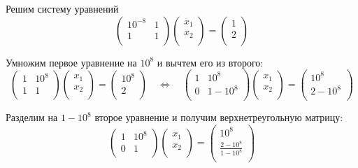 \documentclass{article}
\begin{document}
\begin{example}
	Решим систему уравнений
	\[
		\begin{pmatrix}
			10^{-8}	& 1	\\
			1	& 1	\\
		\end{pmatrix}
		\begin{pmatrix}
			x_1 \\
			x_2 \\
		\end{pmatrix}
		=
		\begin{pmatrix}
			1 \\
			2 \\
		\end{pmatrix}
	\]

	Умножим первое уравнение на $10^8$ и вычтем его из второго:
	\[
		\begin{pmatrix}
			1	& 10^8	\\
			1	& 1	\\
		\end{pmatrix}
		\begin{pmatrix}	
			x_1 \\
			x_2 \\
		\end{pmatrix}
		=
		\begin{pmatrix}
			10^8 \\
			2    \\
		\end{pmatrix}
		\quad\Leftrightarrow\quad
		\begin{pmatrix}
			1	& 10^8	\\
			0	&1-10^8	\\
		\end{pmatrix}
		\begin{pmatrix}
			x_1 \\
			x_2 \\
		\end{pmatrix}
		=
		\begin{pmatrix}
			10^8 \\
			2-10^8 \\
		\end{pmatrix}
	\]

	Разделим на $1-10^8$ второе уравнение и получим верхнетреугольную
	матрицу:
	\[
		\begin{pmatrix}
			1	& 10^8	\\
			0	& 1	\\
		\end{pmatrix}
		\begin{pmatrix}
			x_1 \\
			x_2 \\
		\end{pmatrix}
		=
		\begin{pmatrix}
			10^8 \\
			\frac{2-10^8}{1-10^8} \\
		\end{pmatrix}
	\]


\end{example}
\end{document}

